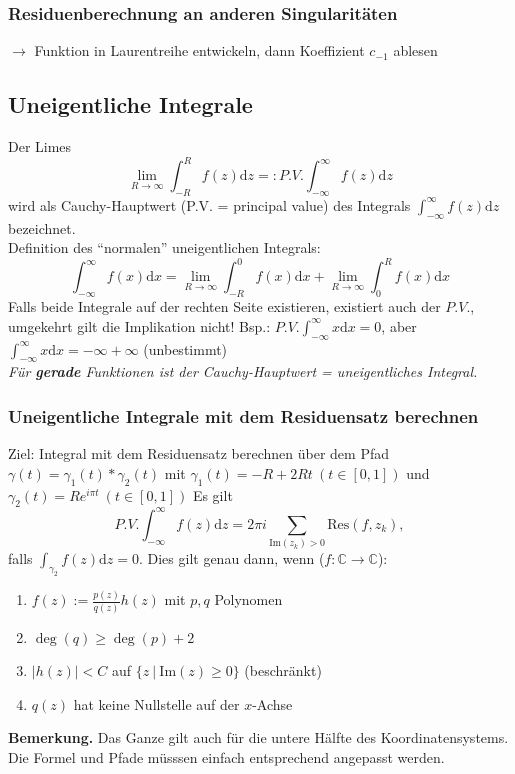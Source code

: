\documentclass[8pt, a4paper, landscape, fleqn]{scrartcl}
\newenvironment {example}
				{\begin{itshape} \begin{small}}
				{\end{small} \end{itshape}}
\def\C{\mathbb{C}}
\def\d{\text{d}}
\def\Im{\text{Im}}
\def\Res{\text{Res}}
\newcommand{\blue}[1]{\textcolor{ethblue}{#1}}
\begin{document}
\begin{multicols*}{3}
	    
	    \subsubsection{Residuenberechnung an anderen Singularitäten}
	    $\rightarrow$ Funktion in Laurentreihe entwickeln, dann Koeffizient $c_{-1}$ ablesen \\
	    
	    \subsection{Uneigentliche Integrale}
	    Der Limes $$ \lim_{R\to\infty}\int_{-R}^R f(z) \d z =: P.V. \int_{-\infty}^\infty f(z) \d z$$ wird als \blue{Cauchy-Hauptwert (P.V. = principal value)} des Integrals $\int_{-\infty}^\infty f(z) \d z$ bezeichnet.\\
	    Definition des ``normalen'' uneigentlichen Integrals: $$ \int_{-\infty}^\infty f(x) \d x = \lim_{R\to\infty} \int_{-R}^0 f(x) \d x + \lim_{R\to\infty} \int_0^R f(x) \d x$$
	    Falls beide Integrale auf der rechten Seite existieren, existiert auch der $P.V.$, umgekehrt gilt die Implikation nicht! Bsp.: $P.V. \int_{-\infty}^\infty x \d x = 0$, aber $\int_{-\infty}^\infty x \d x = -\infty + \infty$ (unbestimmt)\\
	    \textit{Für \textbf{gerade} Funktionen ist der Cauchy-Hauptwert = uneigentliches Integral.}
	    
	    
	    \subsubsection{Uneigentliche Integrale mit dem Residuensatz berechnen}
	    Ziel: Integral mit dem Residuensatz berechnen über dem Pfad $\gamma(t) = \gamma_1(t) * \gamma_2 (t)$ mit $\gamma_1(t) = -R + 2Rt \ (t\in [0, 1])$ und $\gamma_2(t) = Re^{i\pi t}\ (t\in [0, 1])$
	    Es gilt $$P.V. \int_{-\infty}^\infty f(z) \d z = 2\pi i \sum_{\Im(z_k)>0} \Res(f, z_k), $$ falls $\int_{\gamma_2} f(z) \d z = 0$. Dies gilt genau dann, wenn ($f: \C\to\C$): 
	    \begin{enumerate}
	        \item $f(z) := \frac{p(z)}{q(z)}h(z)$ mit $p, q$ Polynomen
	        \item $\deg(q) \geq \deg(p)+2$
	        \item $|h(z)| < C$ auf $\{z \ | \ \Im(z) \geq 0\}$ (beschränkt)
	        \item $q(z)$ hat keine Nullstelle auf der $x$-Achse
	    \end{enumerate}
	    \begin{example}
	        \textbf{Bemerkung. } Das Ganze gilt auch für die untere Hälfte des Koordinatensystems. Die Formel und Pfade müsssen einfach entsprechend angepasst werden. 
	    \end{example}
	    

\end{multicols*}
\end{document}
